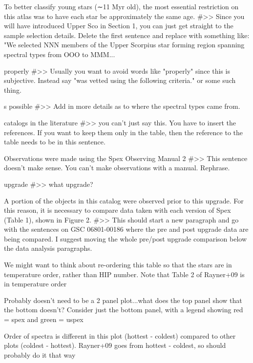 
To better classify young stars (∼11 Myr old), the most essential restriction on this atlas was to have each star be approximately the same age.
#>> Since you will have introduced Upper Sco in Section 1, you can just get straight to the sample selection details. Delete the first sentence and replace with something like: "We selected NNN members of the Upper Scorpius star forming region spanning spectral types from OOO to MMM...

properly
#>> Usually you want to avoid words like "properly" since this is subjective. Instead say "was vetted using the following criteria." or some such thing.


s possible
#>> Add in more details as to where the spectral types came from.

 catalogs in the literature
 #>> you can't just say this. You have to insert the references. If you want to keep them only in the table, then the reference to the table needs to be in this sentence.






Observations were made using the Spex Observing Manual 2
#>> This sentence doesn't make sense. You can't make observations with a manual. Rephrase.

upgrade
#>> what upgrade?


A portion of the objects in this catalog were observed prior to this upgrade. For this reason, it is necessary to compare data taken with each version of Spex (Table 1), shown in Figure 2.
#>> This should start a new paragraph and go with the sentences on GSC 06801-00186 where the pre and post upgrade data are being compared. I suggest moving the whole pre/post upgrade comparison below the data analysis paragraphs.



We might want to think about re-ordering this table so that the stars are in temperature order, rather than HIP number. Note that Table 2 of Rayner+09 is in temperature order

Probably doesn’t need to be a 2 panel plot...what does the top panel show that the bottom doesn’t? Consider just the bottom panel, with a legend showing red = spex and green = uspex

Order of spectra is different in this plot (hottest - coldest) compared to other plots (coldest - hottest). Rayner+09 goes from hottest - coldest, so should probably do it that way